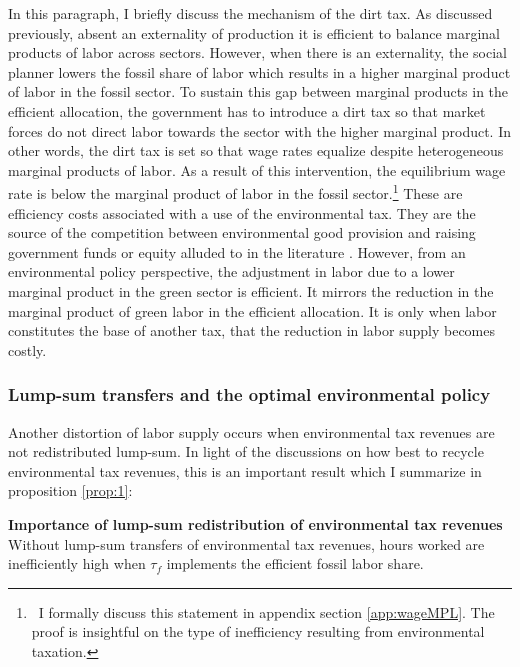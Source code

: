 In this paragraph, I briefly discuss the mechanism of the dirt tax.
As discussed previously, absent an externality of production it is efficient to balance marginal products of labor across sectors. However, when there is an externality, the social planner lowers the fossil share of labor which results in a higher marginal product of labor in the fossil sector. To sustain this gap between marginal products in the efficient allocation, the government has to introduce a dirt tax so that market forces do not direct labor towards the sector with the higher marginal product. In other words, the dirt tax is set so that wage rates equalize despite heterogeneous marginal products of labor. As a result of this intervention, the equilibrium wage rate is below the marginal product of labor in the fossil sector.\footnote{\ I formally discuss this statement in appendix section \ref{app:wageMPL}. The proof is insightful on the type of inefficiency resulting from environmental taxation. } These are efficiency costs associated with a use of the environmental tax. They are the source of the competition between environmental good provision and raising government funds or equity alluded to in the literature \citep[e.g.][]{LansBovenberg1994EnvironmentalTaxation}.  
However, from an environmental policy perspective, the adjustment in labor due to a lower marginal product in the green sector is efficient. It mirrors the reduction in the marginal product of green labor in the efficient allocation. It is only when labor constitutes the base of another tax, that the reduction in labor supply becomes costly. 
\subsubsection{Lump-sum transfers and the optimal environmental policy}\label{subsec:nolump}

Another distortion of labor supply occurs when environmental tax revenues are not redistributed lump-sum.
In light of the discussions on how best to recycle environmental tax revenues, this is an important result which I summarize in proposition \ref{prop:1}:

\begin{prop}\label{prop:1}\textbf{Importance of lump-sum redistribution of environmental tax revenues}
	Without lump-sum transfers of environmental tax revenues, hours worked are inefficiently high when $\tau_{f}$ implements the efficient fossil labor share.
\end{prop}

